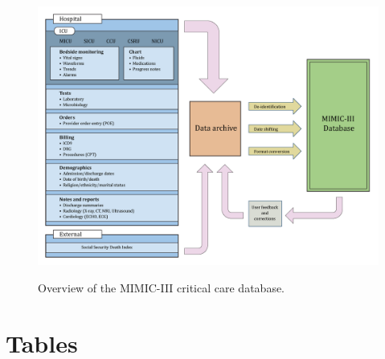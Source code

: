 \documentclass[english]{article}
\begin{document}
\begin{center}
\begin{figure}
\caption{Overview of the MIMIC-III critical care database.}
\includegraphics[width=\textwidth]{MIMICData.png}
\label{fig:mimicoverview}
\end{figure}
\end{center}

\section*{Tables}




\end{document}

